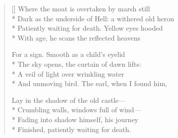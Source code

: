 \label{ch:lear_bp}
\settowidth{\versewidth}{Dark as the underside of Hell: a withered old heron}
\begin{verse}[\versewidth]
 Where the moat is overtaken by marsh still\\*
Dark as the underside of Hell: a withered old heron\\*
Patiently waiting for death. Yellow eyes hooded\\*
With age, he scans the reflected heavens

For a sign. Smooth as a child's eyelid\\*
The sky opens, the curtain of dawn lifts:\\*
A veil of light over wrinkling water\\*
And unmoving bird. The earl, when I found him,

Lay in the shadow of the old castle---\\*
Crumbling walls, windows full of wind---\\*
Fading into shadow himself, his journey\\*
Finished, patiently waiting for death.
\end{verse}
